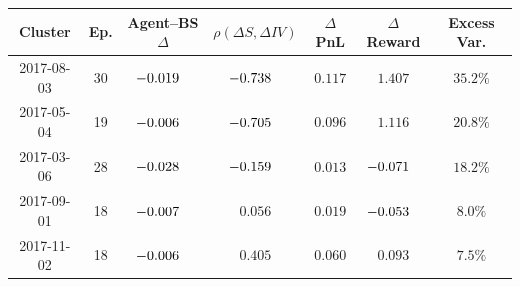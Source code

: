\begingroup
\renewcommand{\arraystretch}{1.12}
\setlength{\tabcolsep}{3.8pt}
\begin{tabular}{@{}ccccccc@{}}
\toprule
Cluster & Ep. & Agent--BS $\Delta$ & $\rho(\Delta S,\Delta IV)$ & $\Delta$PnL & $\Delta$Reward & Excess Var. \\
\midrule
2017-08-03 & 30 & $\mathllap{-}0.019$ & $\mathllap{-}0.738$ & $0.117$ & $1.407$ & $35.2\%$ \\
2017-05-04 & 19 & $\mathllap{-}0.006$ & $\mathllap{-}0.705$ & $0.096$ & $1.116$ & $20.8\%$ \\
2017-03-06 & 28 & $\mathllap{-}0.028$ & $\mathllap{-}0.159$ & $0.013$ & $\mathllap{-}0.071$ & $18.2\%$ \\
2017-09-01 & 18 & $\mathllap{-}0.007$ & $0.056$ & $0.019$ & $\mathllap{-}0.053$ & $8.0\%$ \\
2017-11-02 & 18 & $\mathllap{-}0.006$ & $0.405$ & $0.060$ & $0.093$ & $7.5\%$ \\
\bottomrule
\end{tabular}
\endgroup
